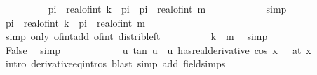 \begin{isabellebody}
\ \ \ \ \ \ \ \ \isamarkupfalse%
\ {\isachardoublequoteopen}pi\ {\isacharasterisk}{\kern0pt}\ real{\isacharunderscore}{\kern0pt}of{\isacharunderscore}{\kern0pt}int\ k\ {\isacharless}{\kern0pt}\ pi\ {\isacharplus}{\kern0pt}\ pi\ {\isacharasterisk}{\kern0pt}\ {\isacharparenleft}{\kern0pt}real{\isacharunderscore}{\kern0pt}of{\isacharunderscore}{\kern0pt}int\ m{\isacharparenright}{\kern0pt}{\isachardoublequoteclose}\isanewline
\ \ \ \ \ \ \ \ \ \ \isamarkupfalse%
\ simp\isanewline
\ \ \ \ \ \ \ \ \isamarkupfalse%
\ {\isachardoublequoteopen}pi\ {\isacharasterisk}{\kern0pt}\ real{\isacharunderscore}{\kern0pt}of{\isacharunderscore}{\kern0pt}int\ k\ {\isacharless}{\kern0pt}\ pi\ {\isacharasterisk}{\kern0pt}\ {\isacharparenleft}{\kern0pt}real{\isacharunderscore}{\kern0pt}of{\isacharunderscore}{\kern0pt}int\ {\isacharparenleft}{\kern0pt}{}{\isacharplus}{\kern0pt}m{\isacharparenright}{\kern0pt}{\isacharparenright}{\kern0pt}{\isachardoublequoteclose}\isanewline
\ \ \ \ \ \ \ \ \ \ \isamarkupfalse%
\ {\isacharparenleft}{\kern0pt}simp\ only{\isacharcolon}{\kern0pt}\ of{\isacharunderscore}{\kern0pt}int{\isacharunderscore}{\kern0pt}add\ of{\isacharunderscore}{\kern0pt}int{\isacharunderscore}{\kern0pt}{}\ distrib{\isacharunderscore}{\kern0pt}left{\isacharparenright}{\kern0pt}\isanewline
\ \ \ \ \ \ \ \ \isamarkupfalse%
\ {\isachardoublequoteopen}k\ {\isasymle}\ m{\isachardoublequoteclose}\ \isamarkupfalse%
\ simp\isanewline
\ \ \ \ \ \ \isamarkupfalse%
\isanewline
\ \ \ \ \ \ \isamarkupfalse%
\ \isamarkupfalse%
\ False\ \isamarkupfalse%
\ simp\isanewline
\ \ \ \ \isamarkupfalse%
\isanewline
\ \ \ \ \isamarkupfalse%
\ \isamarkupfalse%
\ {\isachardoublequoteopen}{\isacharparenleft}{\kern0pt}{\isacharparenleft}{\kern0pt}{\isasymlambda}u{\isachardot}{\kern0pt}\ tan\ u\ {\isacharminus}{\kern0pt}\ u{\isacharparenright}{\kern0pt}\ has{\isacharunderscore}{\kern0pt}real{\isacharunderscore}{\kern0pt}derivative\ {}{\isacharslash}{\kern0pt}{\isacharparenleft}{\kern0pt}cos\ x{\isacharparenright}{\kern0pt}\ {\isacharminus}{\kern0pt}\ {}{\isacharparenright}{\kern0pt}\ {\isacharparenleft}{\kern0pt}at\ x{\isacharparenright}{\kern0pt}{\isachardoublequoteclose}\isanewline
\ \ \ \ \ \ \isamarkupfalse%
\ {\isacharparenleft}{\kern0pt}intro\ derivative{\isacharunderscore}{\kern0pt}eq{\isacharunderscore}{\kern0pt}intros{\isacharsemicolon}{\kern0pt}\ blast{\isacharquery}{\kern0pt}{\isacharparenright}{\kern0pt}\ {\isacharparenleft}{\kern0pt}simp\ add{\isacharcolon}{\kern0pt}\ field{\isacharunderscore}{\kern0pt}simps{\isacharparenright}{\kern0pt}\isanewline

\end{isabellebody}
